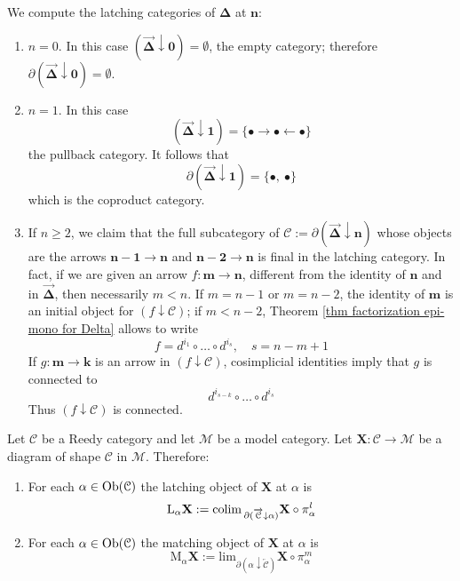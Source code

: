 \begin{refsection}
\begin{eg} \label{eg computing latching categories}
We compute the latching categories of $\mathbf \Delta$ at $\mathbf n$:
\begin{enumerate}
\item $n = 0$. In this case $( \overrightarrow{\mathbf \Delta} \downarrow \mathbf 0 ) = \emptyset$, the empty category; therefore $\partial (\overrightarrow{\mathbf \Delta} \downarrow \mathbf 0) = \emptyset$.
\item $n = 1$. In this case
\[
(\overrightarrow{\mathbf \Delta} \downarrow \mathbf 1) = \{\bullet \rightarrow \bullet \leftarrow \bullet \}
\]
the pullback category. It follows that
\[
\partial ( \overrightarrow{ \mathbf \Delta} \downarrow \mathbf 1 ) = \{\bullet, \: \bullet \}
\]
which is the coproduct category.
\item If $n \ge 2$, we claim that the full subcategory of $\mathcal C := \partial ( \overrightarrow{\mathbf \Delta} \downarrow \mathbf n )$ whose objects are the arrows $\mathbf{n-1} \to \mathbf n$ and $\mathbf{n-2} \to \mathbf n$ is final in the latching category. In fact, if we are given an arrow $f \colon \mathbf m \to \mathbf n$, different from the identity of $\mathbf n$ and in $\overrightarrow{\mathbf \Delta}$, then necessarily $m < n$. If $m = n - 1$ or $m = n - 2$, the identity of $\mathbf m$ is an initial object for $(f \downarrow \mathcal C)$; if $m < n-2$, Theorem \ref{thm factorization epi-mono for Delta} allows to write
\[
f = d^{i_1} \circ \ldots \circ d^{i_s}, \quad s = n - m + 1
\]
If $g \colon \mathbf m \to \mathbf k$ is an arrow in $(f \downarrow \mathcal C)$, cosimplicial identities imply that $g$ is connected to
\[
d^{i_{s-k}} \circ \ldots \circ d^{i_s}
\]
Thus $(f \downarrow \mathcal C)$ is connected.
\end{enumerate}
\end{eg}

\begin{defin}
Let $\mathcal C$ be a Reedy category and let $\mathcal M$ be a model category. Let $\mathbf X \colon \mathcal C \to \mathcal M$ be a diagram of shape $\mathcal C$ in $\mathcal M$. Therefore:
\begin{enumerate}
\item For each $\alpha \in \operatorname{Ob}(\mathcal C)$ the latching object of $\mathbf X$ at $\alpha$ is
\[
\mathrm L_\alpha \mathbf X := \mathrm{colim} \,_{\partial ( \overrightarrow{\mathcal C} \downarrow \alpha )} \mathbf X \circ \pi_\alpha^l
\]
\item For each $\alpha \in \operatorname{Ob}(\mathcal C)$ the matching object of $\mathbf X$ at $\alpha$ is
\[
\mathrm M_\alpha \mathbf X := \mathrm{lim}_{\partial ( \alpha \downarrow \overleftarrow{\mathcal C} )} \mathbf X \circ \pi_\alpha^m
\]
\end{enumerate}
\end{defin}


\end{refsection}
